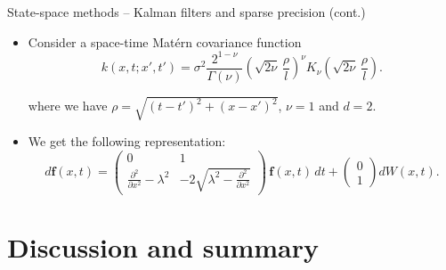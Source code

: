 \documentclass[first=dgreen,second=purple,presentation]{elecslides}
\begin{document}
\begin{frame}{State-space methods -- Kalman filters and sparse precision (cont.)}
\begin{example}
%
\begin{itemize}[<+->]
\item Consider a space-time Mat\'ern covariance function
%
  $$ k(x,t;x',t') = \sigma^2\frac{2^{1-\nu}}{\Gamma(\nu)}\left(\sqrt{2\nu}\,\frac{\rho}{
l}\right)^\nu K_\nu\left(\sqrt{2\nu}\,\frac{\rho}{l}\right). $$

where we have $\rho = \sqrt{(t-t')^2+ (x-x')^2}$, $\nu=1$ and $d=2$.

\item We get the following representation:
%
\begin{equation}
  d\mathbf{f}(x,t) = 
       \begin{pmatrix} 
        0 & 1 \\ 
        \frac{\partial^2}{\partial x^2} - \lambda^2
        & -2 \sqrt{\lambda^2 - \frac{\partial^2}{\partial x^2}}
      \end{pmatrix} \, \mathbf{f}(x,t) \, dt+ \begin{pmatrix} 0 \\ 1 \end{pmatrix} dW(x,t).
\nonumber
\end{equation}
%

%
%
\end{itemize}
\end{example}

\end{frame}

\section{Discussion and summary}
\end{document}
